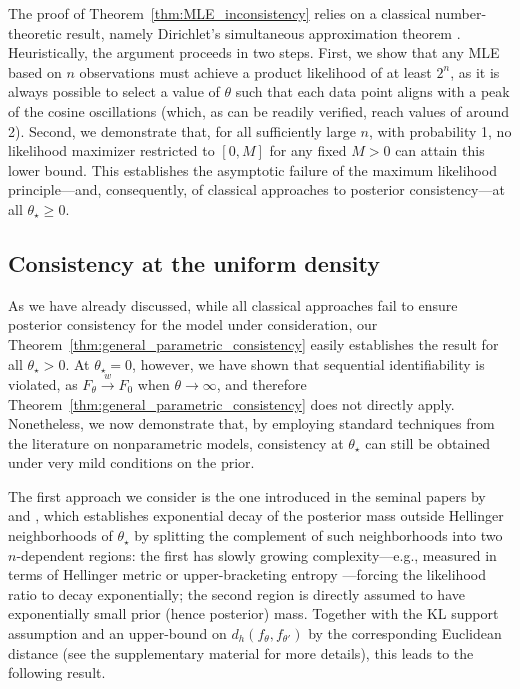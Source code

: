 \documentclass[11pt,twoside]{article}
\newcommand{\wc}{\overset{w}{\longrightarrow}}
\begin{document}
The proof of Theorem~\ref{thm:MLE_inconsistency} relies on a classical number-theoretic result, namely Dirichlet's simultaneous approximation theorem \citep{schmidt2009diophantine}. Heuristically, the argument proceeds in two steps. First, we show that any MLE based on \(n\) observations must achieve a product likelihood of at least \(2^n\), as it is always possible to select a value of \(\theta\) such that each data point aligns with a peak of the cosine oscillations (which, as can be readily verified, reach values of around 2). Second, we demonstrate that, for all sufficiently large \(n\), with probability 1, no likelihood maximizer restricted to \([0, M]\) for any fixed \(M > 0\) can attain this lower bound. This establishes the asymptotic failure of the maximum likelihood principle—and, consequently, of classical approaches to posterior consistency—at all $\theta_\star \geq 0$.






\subsection{Consistency at the uniform density}\label{sub:consistency_at_0}

As we have already discussed, while all classical approaches fail to ensure posterior consistency for the model under consideration, our Theorem~\ref{thm:general_parametric_consistency} easily establishes the result for all $\theta_\star > 0$. At $\theta_\star = 0$, however, we have shown that sequential identifiability is violated, as $F_\theta \wc F_0$ when $\theta \to \infty$, and therefore Theorem~\ref{thm:general_parametric_consistency} does not directly apply. Nonetheless, we now demonstrate that, by employing standard techniques from the literature on nonparametric models, consistency at $\theta_\star$ can still be obtained under very mild conditions on the prior.

The first approach we consider is the one introduced in the seminal papers by \cite{ghosal1999} and \cite{barron1999}, which establishes exponential decay of the posterior mass outside Hellinger neighborhoods of $\theta_\star$ by splitting the complement of such neighborhoods into two $n$-dependent regions: the first has slowly growing complexity—e.g., measured in terms of Hellinger metric or upper-bracketing entropy \citep{vandegeer2000empirical, wainwright2019high}—forcing the likelihood ratio to decay exponentially; the second  region is directly assumed to have exponentially small prior (hence posterior) mass. Together with the KL support assumption and an upper-bound on $d_h(f_\theta, f_{\theta'})$ by the corresponding Euclidean distance (see the supplementary material for more details), this leads to the following result.
\end{document}
